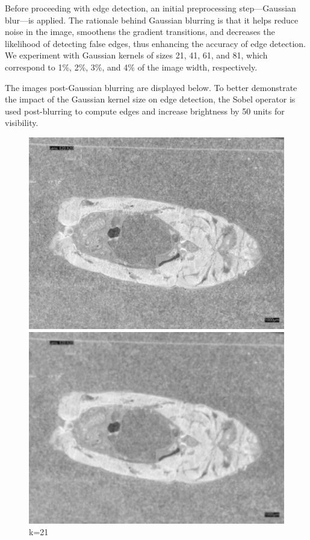 Before proceeding with edge detection, an initial preprocessing step—Gaussian blur—is applied. The rationale behind Gaussian blurring is that it helps reduce noise in the image, smoothens the gradient transitions, and decreases the likelihood of detecting false edges, thus enhancing the accuracy of edge detection\cite{4.3}. We experiment with Gaussian kernels of sizes 21, 41, 61, and 81, which correspond to 1\%, 2\%, 3\%, and 4\% of the image width, respectively.

The images post-Gaussian blurring are displayed below. To better demonstrate the impact of the Gaussian kernel size on edge detection, the Sobel operator is used post-blurring to compute edges and increase brightness by 50 units for visibility.

\begin{figure}
    \centering
    \begin{minipage}{0.24\textwidth}
        \centering
        \includegraphics[width=\textwidth]{./fig/gausssian/blurred21.jpg}
        \caption*{k=21}
    \end{minipage}
    \begin{minipage}{0.24\textwidth}
        \centering
        \includegraphics[width=\textwidth]{./fig/gausssian/blurred41.jpg}

\end{minipage}
\end{figure}
